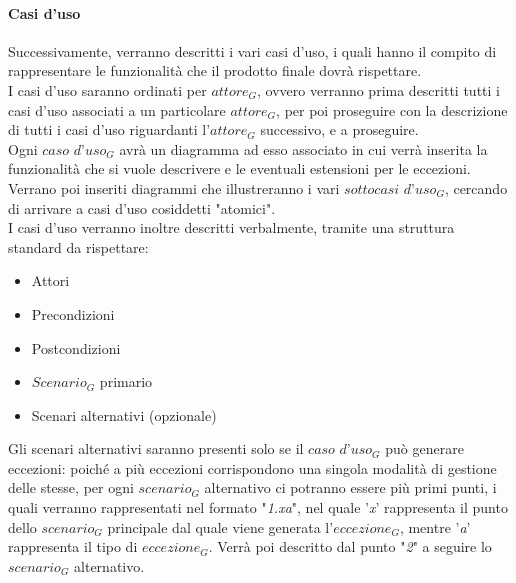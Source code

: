 \paragraph{Casi d'uso}
Successivamente, verranno descritti i vari casi d'uso, i quali hanno il compito di rappresentare le funzionalità che il prodotto finale dovrà rispettare. \\
I casi d'uso saranno ordinati per $\textit{attore}_G$, ovvero verranno prima descritti tutti i casi d'uso associati a un particolare $\textit{attore}_G$, per poi proseguire con la descrizione di tutti i casi d'uso riguardanti l'$\textit{attore}_G$ successivo, e a proseguire. \\
Ogni $\textit{caso d'uso}_G$ avrà un diagramma ad esso associato in cui verrà inserita la funzionalità che si vuole descrivere e le eventuali estensioni per le eccezioni. Verrano poi inseriti diagrammi che illustreranno i vari $\textit{sottocasi d'uso}_G$, cercando di arrivare a casi d'uso cosiddetti "atomici". \\
I casi d'uso verranno inoltre descritti verbalmente, tramite una struttura standard da rispettare:
\begin{itemize}
    \item Attori
    \item Precondizioni
    \item Postcondizioni
    \item $\textit{Scenario}_G$ primario
    \item Scenari alternativi (opzionale)
\end{itemize}
\begin{comment}
I $\textit{sottocasi d'uso}_G$ non verranno descritti individualmente, poiché sarà già tutto descritto a livello atomico nello $\textit{scenario}_G$ principale del relativo $\textit{caso d'uso}_G$ "padre".
\end{comment}
Gli scenari alternativi saranno presenti solo se il $\textit{caso d'uso}_G$ può generare eccezioni: poiché a più eccezioni corrispondono una singola modalità di gestione delle stesse, per ogni $\textit{scenario}_G$ alternativo ci potranno essere più primi punti, i quali verranno rappresentati nel formato "\textit{1.xa}", nel quale '\textit{x}' rappresenta il punto dello $\textit{scenario}_G$ principale dal quale viene generata l'$\textit{eccezione}_G$, mentre '\textit{a}' rappresenta il tipo di $\textit{eccezione}_G$. Verrà poi descritto dal punto "\textit{2}" a seguire lo $\textit{scenario}_G$ alternativo.
